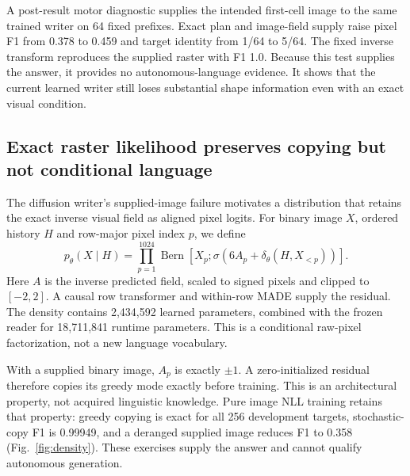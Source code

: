 \documentclass[12pt,a4paper]{article}
\newcommand{\DensityCopyFone}{0.99949}
\begin{document}
A post-result motor diagnostic supplies the intended first-cell image to the
same trained writer on 64 fixed prefixes. Exact plan and image-field supply
raise pixel F1 from 0.378 to 0.459 and target identity from 1/64 to 5/64.
The fixed inverse transform reproduces the supplied raster with F1 1.0.
Because this test supplies the answer, it provides no autonomous-language
evidence. It shows that the current learned writer still loses substantial
shape information even with an exact visual condition.


\subsection*{Exact raster likelihood preserves copying but not conditional language}
The diffusion writer's supplied-image failure motivates a distribution that
retains the exact inverse visual field as aligned pixel logits. For binary
image $X$, ordered history $H$ and row-major pixel index $p$, we define
\begin{equation}
p_\theta(X\mid H)=\prod_{p=1}^{1024}
\operatorname{Bern}\!\left[X_p;\sigma(6A_p+\delta_\theta(H,X_{<p}))\right].
\end{equation}
Here $A$ is the inverse predicted field, scaled to signed pixels and clipped
to $[-2,2]$. A causal row transformer and within-row MADE supply the residual.
The density contains 2,434,592 learned parameters, combined with the frozen
reader for 18,711,841 runtime parameters. This is a conditional raw-pixel
factorization\cite{pixelrnn,pixelcnn,made}, not a new language vocabulary.

With a supplied binary image, $A_p$ is exactly $\pm1$. A zero-initialized
residual therefore copies its greedy mode exactly before training. This is an
architectural property, not acquired linguistic knowledge. Pure image NLL
training retains that property: greedy copying is exact for all 256 development
targets, stochastic-copy F1 is \DensityCopyFone, and a deranged supplied image
reduces F1 to 0.358 (Fig.~\ref{fig:density}). These exercises supply the answer
and cannot qualify autonomous generation.
\end{document}
